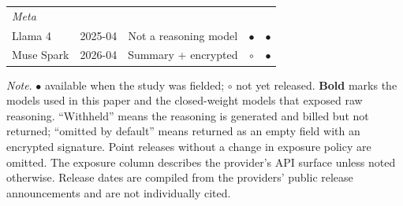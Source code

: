 \documentclass[manuscript,review,anonymous]{acmart}
\begin{document}
\begin{table}[H]
\begin{tabular}{llccc}
\multicolumn{5}{l}{\textit{Meta}~\cite{meta2025llama4,meta2026reasoning}} \\
\quad Llama 4               & 2025-04 & Not a reasoning model & $\bullet$ & $\bullet$ \\
\quad Muse Spark            & 2026-04 & Summary + encrypted & $\circ$   & $\bullet$ \\
\hline
\end{tabular}




\raggedright \small \textit{Note}. $\bullet$ available when the study was
fielded; $\circ$ not yet released. \textbf{Bold} marks the models used in this
paper and the closed-weight models that exposed raw reasoning. ``Withheld'' means
the reasoning is generated and billed but not returned; ``omitted by default''
means returned as an empty field with an encrypted signature. 
Point releases
without a change in exposure policy are omitted. The exposure column describes
the provider's API surface unless noted otherwise. Release dates are compiled
from the providers' public release announcements and are not individually cited.
\end{table}
\end{document}
